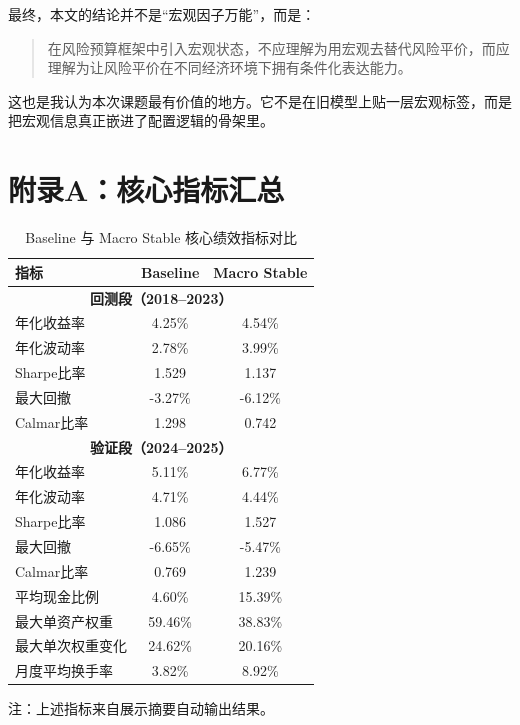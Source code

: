 \documentclass[12pt,a4paper]{ctexart}
\begin{document}
最终，本文的结论并不是“宏观因子万能”，而是：

\begin{quote}
在风险预算框架中引入宏观状态，不应理解为用宏观去替代风险平价，而应理解为让风险平价在不同经济环境下拥有条件化表达能力。
\end{quote}

这也是我认为本次课题最有价值的地方。它不是在旧模型上贴一层宏观标签，而是把宏观信息真正嵌进了配置逻辑的骨架里。

\section*{附录A：核心指标汇总}

\begin{table}[H]
\centering
\caption{Baseline 与 Macro Stable 核心绩效指标对比}
\begin{threeparttable}
\begin{tabular}{lcc}
\toprule
指标 & Baseline & Macro Stable \\
\midrule
\multicolumn{3}{c}{\textbf{回测段（2018--2023）}} \\
年化收益率 & 4.25\% & 4.54\% \\
年化波动率 & 2.78\% & 3.99\% \\
Sharpe比率 & 1.529 & 1.137 \\
最大回撤 & -3.27\% & -6.12\% \\
Calmar比率 & 1.298 & 0.742 \\
\midrule
\multicolumn{3}{c}{\textbf{验证段（2024--2025）}} \\
年化收益率 & 5.11\% & 6.77\% \\
年化波动率 & 4.71\% & 4.44\% \\
Sharpe比率 & 1.086 & 1.527 \\
最大回撤 & -6.65\% & -5.47\% \\
Calmar比率 & 0.769 & 1.239 \\
\midrule
平均现金比例 & 4.60\% & 15.39\% \\
最大单资产权重 & 59.46\% & 38.83\% \\
最大单次权重变化 & 24.62\% & 20.16\% \\
月度平均换手率 & 3.82\% & 8.92\% \\
\bottomrule
\end{tabular}
\begin{tablenotes}
\footnotesize
\item 注：上述指标来自展示摘要自动输出结果。
\end{tablenotes}
\end{threeparttable}
\end{table}
\end{document}
